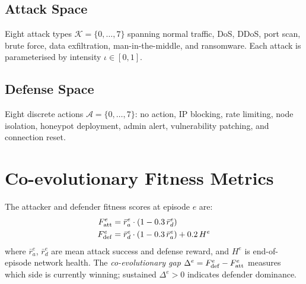 \subsection{Attack Space}
Eight attack types $\mathcal{K} = \{0,\ldots,7\}$ spanning
normal traffic, DoS, DDoS, port scan, brute force, data exfiltration,
man-in-the-middle, and ransomware.
Each attack is parameterised by intensity $\iota \in [0,1]$.

\subsection{Defense Space}
Eight discrete actions $\mathcal{A} = \{0,\ldots,7\}$:
no action, IP blocking, rate limiting, node isolation, honeypot
deployment, admin alert, vulnerability patching, and connection reset.

\section{Co-evolutionary Fitness Metrics}

The attacker and defender fitness scores at episode $e$ are:
\begin{align}
  F_{\mathrm{att}}^e &= \bar r_a^e \cdot (1 - 0.3\,\bar r_d^e) \label{eq:f_att}\\
  F_{\mathrm{def}}^e &= \bar r_d^e \cdot (1 - 0.3\,\bar r_a^e) + 0.2\,H^e \label{eq:f_def}
\end{align}
where $\bar r_a^e$, $\bar r_d^e$ are mean attack success and defense reward,
and $H^e$ is end-of-episode network health.
The \emph{co-evolutionary gap} $\Delta^e = F_{\mathrm{def}}^e - F_{\mathrm{att}}^e$ measures
which side is currently winning; sustained $\Delta^e > 0$ indicates
defender dominance.
